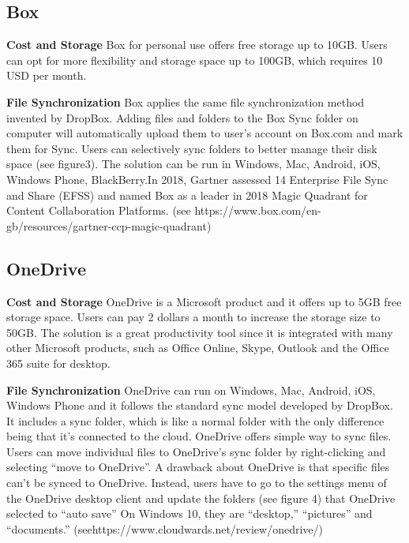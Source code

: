 \documentclass{article}
\begin{document}
\subsection{Box}
\textbf{Cost and Storage}
Box for personal use offers free storage up to 10GB. Users can opt for more flexibility and storage space up to 100GB, which requires 10 USD per month.

\newline
\hfill \break
\textbf{File Synchronization}
Box applies the same file synchronization method invented by DropBox. Adding files and folders to the Box Sync folder on computer will automatically upload them to user’s account on Box.com and mark them for Sync. Users can selectively sync folders to better manage their disk space (see figure3). The solution can be run in Windows, Mac, Android, iOS, Windows Phone, BlackBerry.In 2018, Gartner assessed 14 Enterprise File Sync and Share (EFSS) and named Box as a leader in
2018 Magic Quadrant for Content Collaboration Platforms. (see  https://www.box.com/en-gb/resources/gartner-ccp-magic-quadrant)

\newline
\hfill \break
\subsection{OneDrive}
\textbf{Cost and Storage}
OneDrive is a Microsoft product and it offers up to 5GB free storage space. Users can pay 2 dollars a month to increase the storage size to 50GB. The solution is a great productivity tool since it is integrated with many other Microsoft products, such as Office Online, Skype, Outlook and the Office 365 suite for desktop.

\newline
\hfill \break
\textbf{File Synchronization}
OneDrive can run on Windows, Mac, Android, iOS, Windows Phone and it follows the standard sync model developed by DropBox. It includes a sync folder, which is like a normal folder with the only difference being that it’s connected to the cloud. OneDrive offers simple way to sync files. Users can move individual files to OneDrive’s sync folder by right-clicking and selecting “move to OneDrive”. A drawback about OneDrive is that specific files can’t be synced to OneDrive. Instead, users have to go to the settings menu of the OneDrive desktop client and update the folders (see figure 4) that OneDrive selected to “auto save” On Windows 10, they are “desktop,” “pictures” and “documents.” (seehttps://www.cloudwards.net/review/onedrive/)
\end{document}
